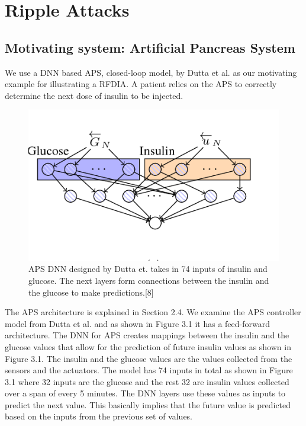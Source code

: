 \chapter{Ripple Attacks}
\label{ch:Chapter2}

\section{Motivating system: Artificial Pancreas System}

We use a DNN based \ac{APS}, closed-loop model, by Dutta et al. \cite{10.1007/978-3-319-99429-1_11}  as our motivating example for illustrating a \ac{RFDIA}. 
A patient relies on  the APS to correctly determine the next dose of insulin to be injected. 

\begin{figure}
	\centering
	\includegraphics[width=0.7\linewidth, height=0.3\linewidth]{Images/APSDNN}
	\caption[APS DNN]{APS DNN designed by Dutta et. takes in 74 inputs of insulin and glucose. The next layers form connections between the insulin and the glucose to make predictions.[8]}
	\label{fig:apsdnn}
\end{figure}

The APS architecture is explained in Section 2.4. 
We examine the \ac{APS} controller model from Dutta et al. and as shown in Figure 3.1 it has a feed-forward architecture. 
The DNN for APS creates mappings between the insulin and the glucose values that allow for the prediction of future insulin values as shown in Figure 3.1. 
The insulin and the glucose values are the values collected from the sensors and the actuators. 
The model has 74 inputs in total as shown in Figure 3.1 where 32 inputs are the glucose and the rest 32  are insulin values collected over a span of every 5 minutes.
 The DNN layers use these values as inputs to predict the next value. 
 This basically implies that the future value is predicted based on the inputs from the previous set of values. 


